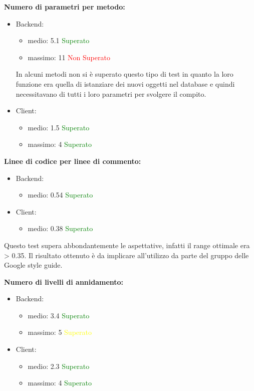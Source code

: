 \begin{description}
				\item \textbf{Numero di parametri per metodo:}
					\begin{itemize}
						\item Backend:
							\begin{itemize}
								\item medio: 5.1 \textcolor{green}{Superato}
								\item massimo: 11 \textcolor{red}{Non Superato}
							\end{itemize}
						In alcuni metodi non si è superato questo tipo di test in quanto la loro funzione era quella di istanziare dei nuovi oggetti nel database e quindi necessitavano di tutti i loro parametri per svolgere il compito.
						\item Client:
							\begin{itemize}
								\item medio: 1.5 \textcolor{green}{Superato}
								\item massimo: 4 \textcolor{green}{Superato}
							\end{itemize}
					\end{itemize}
					
				\item \textbf{Linee di codice per linee di commento:}
					\begin{itemize}
						\item Backend:
							\begin{itemize}
								\item medio: 0.54 \textcolor{green}{Superato}
							\end{itemize}
						\item Client:
							\begin{itemize}
								\item medio: 0.38 \textcolor{green}{Superato}
							\end{itemize}
					\end{itemize}
				Questo test supera abbondantemente le aspettative, infatti il range ottimale era > 0.35. Il risultato ottenuto è da implicare all'utilizzo da parte del gruppo delle Google style guide. 
							
				\item \textbf{Numero di livelli di annidamento:}
					\begin{itemize}
						\item Backend:
							\begin{itemize}
								\item medio: 3.4 \textcolor{green}{Superato}
								\item massimo: 5 \textcolor{yellow}{Superato}
							\end{itemize}
						\item Client:
							\begin{itemize}
								\item medio: 2.3 \textcolor{green}{Superato}
								\item massimo: 4 \textcolor{green}{Superato}
							\end{itemize}
					\end{itemize}
					

\end{description}
